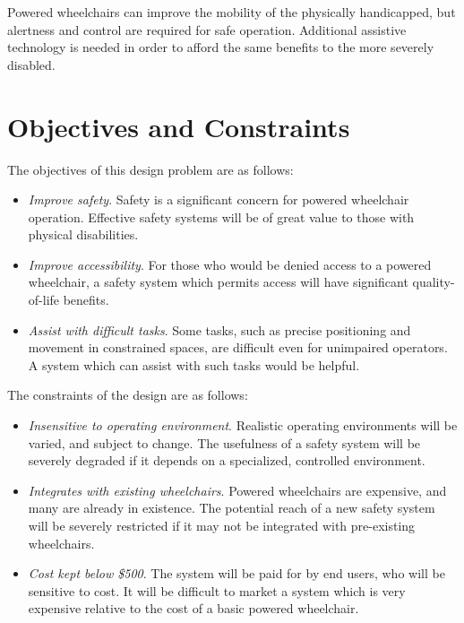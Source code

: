 \documentclass[oneside,final,a4paper]{report}
\begin{document}
Powered wheelchairs can improve the mobility of the physically handicapped, but alertness and control are required for safe operation.  Additional assistive technology is needed in order to afford the same benefits to the more severely disabled.

\section{Objectives and Constraints}
The objectives of this design problem are as follows:

\begin{itemize}
 \item \emph{Improve safety}.  Safety is a significant concern for powered wheelchair operation.  Effective safety systems will be of great value to those with physical disabilities.
 \item \emph{Improve accessibility}.  For those who would be denied access to a powered wheelchair, a safety system which permits access will have significant quality-of-life benefits.
 \item \emph{Assist with difficult tasks}. Some tasks, such as precise positioning and movement in constrained spaces, are difficult even for unimpaired operators.   A system which can assist with such tasks would be helpful.
\end{itemize}

The constraints of the design are as follows:

\begin{itemize}
 \item \emph{Insensitive to operating environment}.  Realistic operating environments will be varied, and subject to change.  The usefulness of a safety system will be severely degraded if it depends on a specialized, controlled environment.
 \item \emph{Integrates with existing wheelchairs}.  Powered wheelchairs are expensive, and many are already in existence.  The potential reach of a new safety system will be severely restricted if it may not be integrated with pre-existing wheelchairs.
 \item \emph{Cost kept below \$500}.  The system will be paid for by end users, who will be sensitive to cost.  It will be difficult to market a system which is very expensive relative to the cost of a basic powered wheelchair.
\end{itemize}
\end{document}
